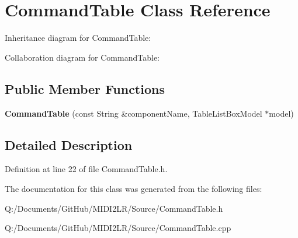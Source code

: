 \hypertarget{class_command_table}{}\section{Command\+Table Class Reference}
\label{class_command_table}


Inheritance diagram for Command\+Table\+:


Collaboration diagram for Command\+Table\+:
\subsection*{Public Member Functions}
\begin{DoxyCompactItemize}
\item 
{\bfseries Command\+Table} (const String \&component\+Name, Table\+List\+Box\+Model $\ast$model)\hypertarget{class_command_table_ab59f0a5853c0de7a5812291cbf5ff5af}{}\label{class_command_table_ab59f0a5853c0de7a5812291cbf5ff5af}

\end{DoxyCompactItemize}


\subsection{Detailed Description}


Definition at line 22 of file Command\+Table.\+h.



The documentation for this class was generated from the following files\+:\begin{DoxyCompactItemize}
\item 
Q\+:/\+Documents/\+Git\+Hub/\+M\+I\+D\+I2\+L\+R/\+Source/Command\+Table.\+h\item 
Q\+:/\+Documents/\+Git\+Hub/\+M\+I\+D\+I2\+L\+R/\+Source/Command\+Table.\+cpp\end{DoxyCompactItemize}
